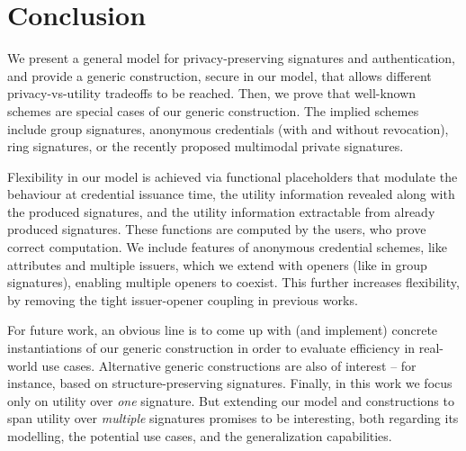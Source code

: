 \section{Conclusion}
\label{sec:conclusion}

We present a general model for privacy-preserving signatures and authentication,
and provide a generic construction, secure in our model, that allows
different privacy-vs-utility tradeoffs to be reached.
%
Then, we prove that well-known schemes are special cases of our generic
construction. The implied schemes include group signatures, anonymous
credentials (with and without revocation), ring signatures, or the recently
proposed multimodal private signatures.

Flexibility in our model is achieved via functional placeholders that
modulate the behaviour at credential issuance time, the utility
information revealed along with the produced signatures, and the utility
information extractable from already produced signatures. These functions are
computed by the users, who prove correct computation. We include features of
anonymous credential schemes, like attributes and multiple
issuers, which we extend with openers (like in group signatures), enabling
multiple openers to coexist. This further increases flexibility, by removing
the tight issuer-opener coupling in previous works.

For future work, an obvious line is to come up with (and implement) concrete
instantiations of our generic construction in order to evaluate efficiency in
real-world use cases. Alternative generic constructions are also of interest --
for instance, based on structure-preserving signatures.
%
Finally, in this work we focus only on utility over \emph{one} signature. But
extending our model and constructions to span utility over \emph{multiple}
signatures promises to be interesting, both regarding its modelling, the
potential use cases, and the generalization capabilities.


